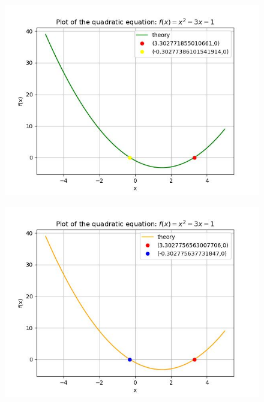 \documentclass[journal,12pt,onecolumn]{IEEEtran}
\theoremstyle{remark}
\begin{document}
\begin{figure}[h] %
    \centering %
    \includegraphics[width=0.5\columnwidth]{figs/fpi.jpeg} %
    \label{fig:example_image} %
\end{figure}

\begin{figure}[h] %
    \centering %
    \includegraphics[width=0.5\columnwidth]{figs/steffenson.jpeg} %
    \label{fig:example_image} %
\end{figure}
\end{document}

